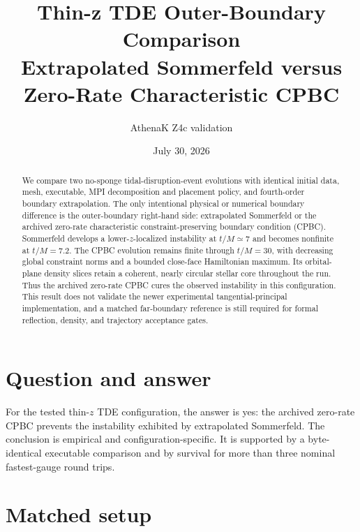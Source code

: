 \documentclass[11pt]{article}
\title{Thin-z TDE Outer-Boundary Comparison\\
\large Extrapolated Sommerfeld versus Zero-Rate Characteristic CPBC}
\author{AthenaK Z4c validation}
\date{July 30, 2026}
\begin{document}
\maketitle

\begin{abstract}
We compare two no-sponge tidal-disruption-event evolutions with identical
initial data, mesh, executable, MPI decomposition and placement policy, and
fourth-order boundary extrapolation.  The only intentional physical or
numerical boundary difference is the outer-boundary right-hand side:
extrapolated Sommerfeld or the archived zero-rate characteristic
constraint-preserving boundary condition (CPBC).
Sommerfeld develops a lower-$z$-localized instability at $t/M\simeq 7$ and
becomes nonfinite at $t/M=7.2$.  The CPBC evolution remains finite through
$t/M=30$, with decreasing global constraint norms and a bounded close-face
Hamiltonian maximum.  Its orbital-plane density slices retain a coherent,
nearly circular stellar core throughout the run.  Thus the archived
zero-rate CPBC cures the observed instability in this configuration.  This
result does not validate the newer experimental tangential-principal
implementation, and a matched far-boundary reference is still required for
formal reflection, density, and trajectory acceptance gates.
\end{abstract}

\section{Question and answer}

For the tested thin-$z$ TDE configuration, the answer is yes: the archived
zero-rate CPBC prevents the instability exhibited by extrapolated
Sommerfeld.  The conclusion is empirical and configuration-specific.  It is
supported by a byte-identical executable comparison and by survival for more
than three nominal fastest-gauge round trips.

\section{Matched setup}
\end{document}
